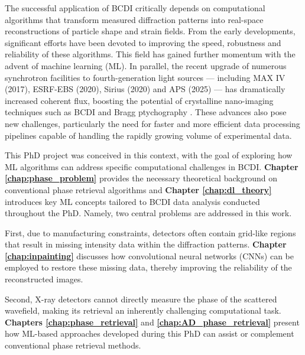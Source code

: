 The successful application of BCDI critically depends on computational algorithms that transform measured diffraction 
patterns into real-space reconstructions of particle shape and strain fields. From the early developments,
significant efforts have been devoted to improving the speed, robustness and reliability of these algorithms. 
This field has gained further momentum with the advent of machine learning (ML). In parallel, the recent upgrade of 
numerous synchrotron facilities to fourth-generation light sources — including MAX IV (2017), ESRF-EBS (2020), 
Sirius (2020) and APS (2025) — has dramatically increased coherent flux, boosting the potential of crystalline 
nano-imaging techniques such as BCDI and Bragg ptychography \cite{Li2022, leake_nanodiffraction_2019, PhysRevLett.121.256101, Chamard2015}. These advances also pose new 
challenges, particularly the need for faster and more efficient data processing pipelines capable of handling the rapidly 
growing volume of experimental data.

This PhD project was conceived in this context, with the goal of exploring how ML algorithms can address specific 
computational challenges in BCDI. \textbf{Chapter \ref{chap:phase_problem}} provides the necessary theoretical background on 
conventional phase retrieval algorithms and \textbf{Chapter \ref{chap:dl_theory}} introduces key ML concepts tailored 
to BCDI data analysis conducted throughout the PhD. Namely, two central problems are addressed in this work.

First, due to manufacturing constraints, detectors often contain grid-like regions that result in missing intensity 
data within the diffraction patterns. \textbf{Chapter \ref{chap:inpainting}} discusses how convolutional neural networks 
(CNNs) can be employed to restore these missing data, thereby improving the reliability of the reconstructed images.

Second, X-ray detectors cannot directly measure the phase of the scattered wavefield, making its retrieval an inherently 
challenging computational task. \textbf{Chapters \ref{chap:phase_retrieval}} and \textbf{\ref{chap:AD_phase_retrieval}} 
present how ML-based approaches developed during this PhD can assist or complement conventional phase retrieval methods. 
